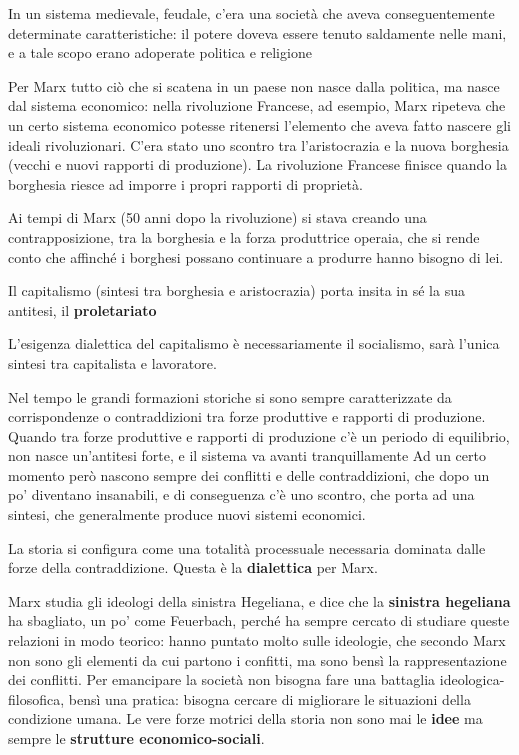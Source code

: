 \documentclass[a4paper, twoside, titlepage]{book}
\begin{document}
In un sistema medievale, feudale, c’era una società che aveva conseguentemente determinate caratteristiche: il potere doveva essere tenuto saldamente nelle mani, e a tale scopo erano adoperate politica e religione

Per Marx tutto ciò che si scatena in un paese non nasce dalla politica, ma nasce dal sistema economico: nella rivoluzione Francese, ad esempio, Marx ripeteva che un certo sistema economico potesse ritenersi l’elemento che aveva fatto nascere gli ideali rivoluzionari.
C’era stato uno scontro tra l’aristocrazia e la nuova borghesia (vecchi e nuovi rapporti di produzione).
La rivoluzione Francese finisce quando la borghesia riesce ad imporre i propri rapporti di proprietà.

Ai tempi di Marx (50 anni dopo la rivoluzione) si stava creando una contrapposizione, tra la borghesia e la forza produttrice operaia, che si rende conto che affinché i borghesi possano continuare a produrre hanno bisogno di lei.

Il capitalismo (sintesi tra borghesia e aristocrazia) porta insita in sé la sua antitesi, il \textbf{proletariato}

L’esigenza dialettica del capitalismo è necessariamente il socialismo, sarà l’unica sintesi tra capitalista e lavoratore.

Nel tempo le grandi formazioni storiche si sono sempre caratterizzate da corrispondenze o contraddizioni tra forze produttive e rapporti di produzione.
Quando tra forze produttive e rapporti di produzione c’è un periodo di equilibrio, non nasce un’antitesi forte, e il sistema va avanti tranquillamente
Ad un certo momento però nascono sempre dei conflitti e delle contraddizioni, che dopo un po’ diventano insanabili, e di conseguenza c’è uno scontro, che porta ad una sintesi, che generalmente produce nuovi sistemi economici.

La storia si configura come una totalità processuale necessaria dominata dalle forze della contraddizione. Questa è la \textbf{dialettica} per Marx.

Marx studia gli ideologi della sinistra Hegeliana, e dice che la \textbf{sinistra hegeliana} ha sbagliato, un po’ come Feuerbach, perché ha sempre cercato di studiare queste relazioni in modo teorico: hanno puntato molto sulle ideologie, che secondo Marx non sono gli elementi da cui partono i confitti, ma sono bensì la rappresentazione dei conflitti.
Per emancipare la società non bisogna fare una battaglia ideologica-filosofica, bensì una pratica: bisogna cercare di migliorare le situazioni della condizione umana.
Le vere forze motrici della storia non sono mai le \textbf{idee} ma sempre le \textbf{strutture economico-sociali}.
\end{document}
